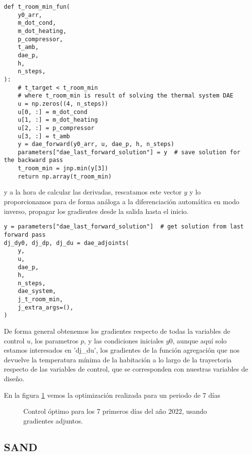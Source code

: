 \begin{verbatim}
def t_room_min_fun(
    y0_arr,
    m_dot_cond,
    m_dot_heating,
    p_compressor,
    t_amb,
    dae_p,
    h,
    n_steps,
):
    # t_target < t_room_min
    # where t_room_min is result of solving the thermal system DAE
    u = np.zeros((4, n_steps))
    u[0, :] = m_dot_cond
    u[1, :] = m_dot_heating
    u[2, :] = p_compressor
    u[3, :] = t_amb
    y = dae_forward(y0_arr, u, dae_p, h, n_steps)
    parameters["dae_last_forward_solution"] = y  # save solution for the backward pass
    t_room_min = jnp.min(y[3])
    return np.array(t_room_min)
\end{verbatim}

y a la hora de calcular las derivadas, rescatamos este vector $y$ y lo
proporcionamos para de forma análoga a la diferenciación automática en modo
inverso, propagar los gradientes desde la salida hasta el inicio.

\begin{verbatim}
y = parameters["dae_last_forward_solution"]  # get solution from last forward pass
dj_dy0, dj_dp, dj_du = dae_adjoints(
    y,
    u,
    dae_p,
    h,
    n_steps,
    dae_system,
    j_t_room_min,
    j_extra_args=(),
)
\end{verbatim}

De forma general obtenemos los gradientes respecto de todas la variables de
control $u$, los parametros $p$, y las condiciones iniciales $y0$, aunque aquí
solo estamos interesados en 'dj\_du', los gradientes de la función agregación
que nos devuelve la temperatura mínima de la habitación a lo largo de la
trayectoria respecto de las variables de control, que se corresponden con
nuestras variables de diseño.


En la figura \ref{fig:control_adjoints_7_days} vemos la optimización realizada
para un periodo de 7 días

\begin{figure}[h] \centering
	\centering
	
	\caption{Control óptimo para los 7 primeros días del año 2022, usando gradientes adjuntos.}
	\label{fig:control_adjoints_7_days}
\end{figure}



\clearpage
\subsection{SAND}

